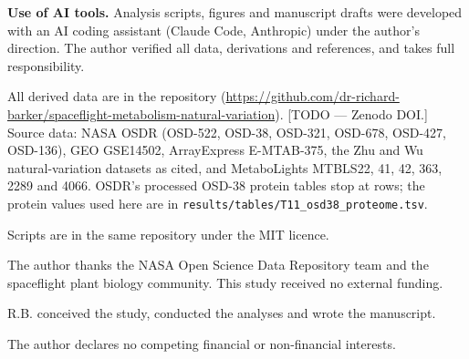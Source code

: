 \documentclass{npjlayout}
\begin{document}
\textbf{Use of AI tools.} Analysis scripts, figures and manuscript drafts were developed with an AI
coding assistant (Claude Code, Anthropic) under the author's direction. The author verified all data,
derivations and references, and takes full responsibility.

\backmatter

 All derived data are in the repository
(\url{https://github.com/dr-richard-barker/spaceflight-metabolism-natural-variation}). [TODO ---
Zenodo DOI.] Source data: NASA OSDR (OSD-522, OSD-38, OSD-321, OSD-678, OSD-427, OSD-136), GEO
GSE14502, ArrayExpress E-MTAB-375, the Zhu and Wu natural-variation datasets as cited, and
MetaboLights MTBLS22, 41, 42, 363, 2289 and 4066. OSDR's
processed OSD-38 protein tables stop at \nOsdRows{} rows; the protein values used here are in
\texttt{results/tables/T11\_osd38\_proteome.tsv}.

 Scripts are in the same repository under the MIT licence.

 The author thanks the NASA Open Science Data Repository team and the
spaceflight plant biology community. This study received no external funding.

 R.B. conceived the study, conducted the analyses and wrote the
manuscript.

 The author declares no competing financial or non-financial interests.


\end{document}
